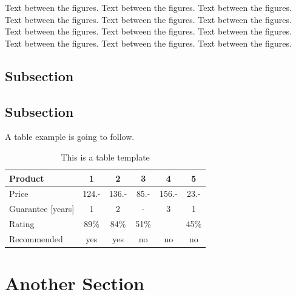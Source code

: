 Text between the figures.  Text between the figures. Text between the figures. Text between the figures.  Text between the figures. Text between the figures. Text between the figures.  Text between the figures. Text between the figures. Text between the figures.  Text between the figures. Text between the figures.

\subsection{Subsection}

\subsection{Subsection}

A table example is going to follow.

\begin{table}[H]
\centering
\caption{This is a table template}
\begin{tabular}{|l|c|c|c|c|c|}
\hline
Product & 1 & 2 & 3 & 4 & 5\\
\hline
Price & 124.- & 136.- & 85.- & 156.- & 23.-\\
Guarantee [years] & 1 & 2 & - & 3 & 1\\
Rating & 89\% & 84\% & 51\% & & 45\%\\
\hline
\hline
Recommended & yes & yes & no & no & no\\
\hline
\end{tabular}
\label{tab:template2}
\end{table}
\section{Another Section} 